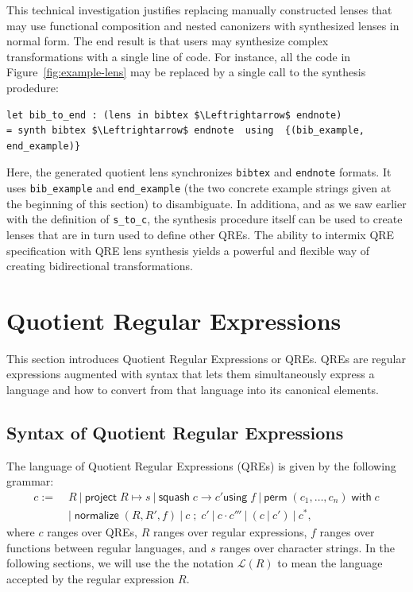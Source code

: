 \documentclass[acmsmall,review,anonymous]{acmart}
\newcommand{\FINISH}[3]{\ifdraft\textcolor{#1}{[#2: #3]}\fi}
\newcommand{\sam}[1]{\FINISH{dkpurple}{SM}{#1}}
\newcommand{\kw}[1]{\ensuremath{\mathsf{#1}}}
\newcommand{\project}[2]{\ensuremath{\kw{project} \; #1 \mapsto #2}}
\newcommand{\squash}[3]{\ensuremath{\kw{squash} \; #1 \rightarrow #2
\kw{using} \; #3}}
\newcommand{\perm}[2]{\ensuremath{\kw{perm}\; (#1)\; \kw{with}\; #2}}
\newcommand{\normalize}[3]{\ensuremath{\kw{normalize} \; (#1, #2, #3)}}
\newcommand{\sep}{\ensuremath{\ | \ }}
\newcommand{\semicolon}{\ensuremath{\; ; \;}}
\newcommand{\cd}[1]{\lstinline[backgroundcolor=\color{white}]$#1$}
\begin{document}


This technical investigation justifies replacing manually constructed lenses that may use
functional composition and nested canonizers with synthesized lenses in normal form.
The end result is that users may synthesize complex transformations with a single line
of code.  For instance, all the code in Figure~\ref{fig:example-lens} may be replaced by
a single call to the synthesis prodedure:

\begin{lstlisting}
let bib_to_end : (lens in bibtex $\Leftrightarrow$ endnote)
= synth bibtex $\Leftrightarrow$ endnote  using  {(bib_example, end_example)}
\end{lstlisting}
\noindent Here, the generated  quotient lens synchronizes \cd{bibtex} and
\cd{endnote} formats.  It uses \cd{bib_example} and \cd{end_example} (the two concrete example
strings given at the beginning of this section) to disambiguate.
In additiona, and as we saw earlier with the definition of \cd{s_to_c}, the synthesis procedure itself
can be used to create lenses that are in turn used to define other QREs.  The ability to intermix
QRE specification with QRE lens synthesis yields a powerful and flexible way of
creating bidirectional transformations.

\section{Quotient Regular Expressions}
\label{QRE}

This section introduces Quotient Regular Expressions or QREs. QREs are regular
expressions augmented with syntax that lets them simultaneously express a
language and how to convert from that language into its canonical elements.

\subsection{Syntax of Quotient Regular Expressions}
The language of Quotient Regular Expressions (QREs) is given by the following
grammar:
\begin{align*}
c := \; &R \sep \project{R}{s} \sep \squash{c}{c'}{f} \sep
\perm{c_1, \ldots, c_n}{c} \\
& | \; \normalize{R}{R'}{f} \sep c \semicolon c' \sep c \cdot c''' \sep (c \sep
c') \sep c^*,
\end{align*}
where $c$ ranges over QREs, $R$ ranges over regular expressions, $f$ ranges over
functions between regular languages, and $s$ ranges over character strings. In
the following sections, we will use the the notation $\mathcal{L}(R)$ to mean
the language accepted by the regular expression $R$.
\end{document}
